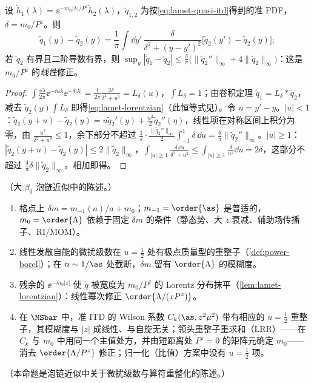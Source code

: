 \begin{lemma}\label{lem:lamet-lorentzian}
设 $\tilde h_1(\lambda)=\ee^{-m_0|\lambda|/P^z}\tilde h_2(\lambda)$，$\tilde q_{1,2}$ 为按\cref{eq:lamet-quasi-itd}得到的准 PDF，$\delta=m_0/P^z$。则
\begin{equation}\label{eq:lamet-lorentzian}
\tilde q_1(y)-\tilde q_2(y)=\frac1\pi\int\dd y'\,\frac{\delta}{\delta^2+(y-y')^2}\big[\tilde q_2(y')-\tilde q_2(y)\big];
\end{equation}
若 $\tilde q_2$ 有界且二阶导数有界，则 $\sup_y|\tilde q_1-\tilde q_2|\le\frac\delta\pi\big(\|\tilde q_2''\|_\infty+4\|\tilde q_2\|_\infty\big)$：这是 $m_0/P^z$ 的\emph{线性}修正。
\end{lemma}

\begin{proof}
$\int\frac{\dd\lambda}{2\pi}\ee^{-\ii u\lambda}\ee^{-\delta|\lambda|}=\frac1{2\pi}\frac{2\delta}{\delta^2+u^2}=L_\delta(u)$，$\int L_\delta=1$；由卷积定理 $\tilde q_1=L_\delta*\tilde q_2$，减去 $\tilde q_2(y)\int L_\delta$ 即得\cref{eq:lamet-lorentzian}（此恒等式见\cite{Ji:2020brr}）。令 $u=y'-y$。$|u|<1$：$\tilde q_2(y+u)-\tilde q_2(y)=u\tilde q_2'(y)+\frac{u^2}2\tilde q_2''(\eta)$，线性项在对称区间上积分为零，由 $\frac{u^2}{\delta^2+u^2}\le1$，余下部分不超过 $\frac1\pi\cdot\frac{\|\tilde q_2''\|_\infty}2\int_{-1}^1\delta\,\dd u=\frac\delta\pi\|\tilde q_2''\|_\infty$。$|u|\ge1$：$|\tilde q_2(y+u)-\tilde q_2(y)|\le2\|\tilde q_2\|_\infty$，$\int_{|u|\ge1}\frac{\delta\,\dd u}{\delta^2+u^2}\le\int_{|u|\ge1}\frac{\delta}{u^2}\dd u=2\delta$，这部分不超过 $\frac4\pi\delta\|\tilde q_2\|_\infty$。相加即得。
\end{proof}

\begin{proposition}\label{prop:lamet-lrr}
（大 $\beta_0$ 泡链近似中的陈述。）
\begin{enumerate}[label=(\alph*),leftmargin=2em,itemsep=1pt,topsep=2pt]
\item 格点上 $\delta m=m_{-1}(a)/a+m_0$；$m_{-1}=\order{\as}$ 是普适的，$m_0=\order{\Lambda}$ 依赖于固定 $\delta m$ 的条件（静态势、大 $z$ 衰减、辅助场传播子、RI/MOM）。
\item 线性发散自能的微扰级数在 $u=\frac12$ 处有极点质量型的重整子（\cref{def:power-borel}）；在 $n\sim1/\as$ 处截断，$\delta m$ 留有 $\order{\Lambda}$ 的模糊度。
\item 残余的 $\ee^{-m_0|z|}$ 使 $\tilde q$ 被宽度为 $m_0/P^z$ 的 Lorentz 分布抹平（\cref{lem:lamet-lorentzian}）：线性幂次修正 $\order{\Lambda/(xP^z)}$。
\item 在 $\MSbar$ 中，准 ITD 的 Wilson 系数 $C_k(\as,z^2\mu^2)$ 带有相应的 $u=\frac12$ 重整子，其模糊度与 $|z|$ 成线性、与自旋无关；领头重整子重求和（LRR）——在 $C_k$ 与 $m_0$ 中用同一个主值处方，并由短距离处 $P^z=0$ 的矩阵元确定 $m_0$——消去 $\order{\Lambda/P^z}$ 修正；归一化（比值）方案中没有 $u=\frac12$ 项。
\end{enumerate}
（本命题是泡链近似中关于微扰级数与算符重整化的陈述。）
\end{proposition}

